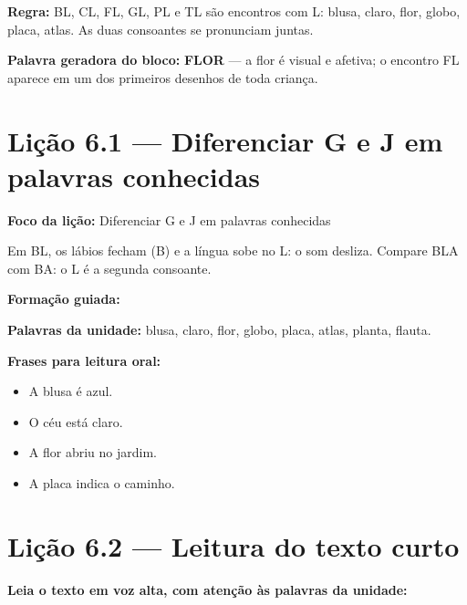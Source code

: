 \textbf{Regra:} BL, CL, FL, GL, PL e TL são encontros com L: blusa, claro, flor, globo, placa, atlas. As duas consoantes se pronunciam juntas.

\textbf{Palavra geradora do bloco:} \textbf{FLOR} --- a flor é visual e afetiva; o encontro FL aparece em um dos primeiros desenhos de toda criança.

\section{Lição 6.1 --- Diferenciar G e J em palavras conhecidas}

\textbf{Foco da lição:} Diferenciar G e J em palavras conhecidas


\begin{boquinha}
Em BL, os lábios fecham (B) e a língua sobe no L: o som desliza. Compare BLA com BA: o L é a segunda consoante.
\end{boquinha}

\noindent\textbf{Formação guiada:}

\begin{center}
\end{center}

\noindent\textbf{Palavras da unidade:} blusa, claro, flor, globo, placa, atlas, planta, flauta.

\noindent\textbf{Frases para leitura oral:}
\begin{itemize}[leftmargin=1.6em]
  \item A blusa é azul.
  \item O céu está claro.
  \item A flor abriu no jardim.
  \item A placa indica o caminho.
\end{itemize}

\section{Lição 6.2 --- Leitura do texto curto}

\noindent\textbf{Leia o texto em voz alta, com atenção às palavras da unidade:}


